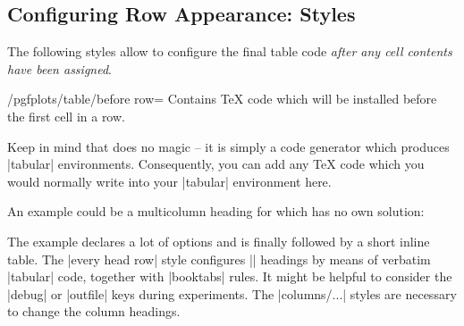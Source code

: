 \documentclass[a4paper]{ltxdoc}
\begin{document}
\subsection{Configuring Row Appearance: Styles}

The following styles allow to configure the final table code \emph{after any
cell contents have been assigned}.

\begin{key}{/pgfplots/table/before row=}
    Contains \TeX{} code which will be installed before the first cell in a
    row.

    Keep in mind that \PGFPlotstable{} does no magic -- it is simply a code
    generator which produces |tabular| environments. Consequently, you can add
    any \TeX{} code which you would normally write into your |tabular|
    environment here.

    An example could be a multicolumn heading for which \PGFPlotstable{} has no
    own solution:
\begin{codeexample}[]
\end{codeexample}
%
    \noindent The example declares a lot of options and is finally followed by
    a short inline table. The |every head row| style configures |\multicolumn|
    headings by means of verbatim |tabular| code, together with |booktabs|
    rules. It might be helpful to consider the |debug| or |outfile| keys during
    experiments. The |columns/...| styles are necessary to change the column
    headings.


\end{key}
\end{document}
